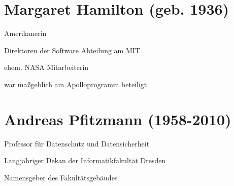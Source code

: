 \documentclass[a4paper,12pt]{scrreprt}
\begin{document}


\section*{Margaret Hamilton (geb. 1936)}
\begin{itemize*}
    \item Amerikanerin
    \item Direktoren der Software Abteilung am MIT
    \item ehem. NASA Mitarbeiterin
    \item war maßgeblich am Apolloprogramm beteiligt
\end{itemize*}

\section*{Andreas Pfitzmann (1958-2010)}
\begin{itemize*}
    \item Professor für Datenschutz und Datensicherheit
    \item Langjähriger Dekan der Informatikfakultät Dresden
    \item Namensgeber des Fakultätsgebäudes
\end{itemize*}

\pagebreak

%
\end{document}
